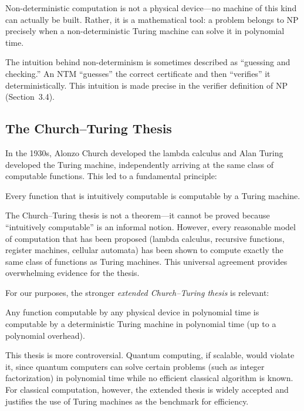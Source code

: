 Non-deterministic computation is not a physical device---no machine of this kind can actually be built. Rather, it is a mathematical tool: a problem belongs to NP precisely when a non-deterministic Turing machine can solve it in polynomial time.

\begin{remark}
The intuition behind non-determinism is sometimes described as ``guessing and checking.'' An NTM ``guesses'' the correct certificate and then ``verifies'' it deterministically. This intuition is made precise in the verifier definition of NP (Section~3.4).
\end{remark}

\subsection{The Church--Turing Thesis}

In the 1930s, Alonzo Church developed the lambda calculus and Alan Turing developed the Turing machine, independently arriving at the same class of computable functions. This led to a fundamental principle:

\begin{thesis}
Every function that is intuitively computable is computable by a Turing machine.
\end{thesis}

The Church--Turing thesis is not a theorem---it cannot be proved because ``intuitively computable'' is an informal notion. However, every reasonable model of computation that has been proposed (lambda calculus, recursive functions, register machines, cellular automata) has been shown to compute exactly the same class of functions as Turing machines. This universal agreement provides overwhelming evidence for the thesis.

For our purposes, the stronger \textit{extended Church--Turing thesis} is relevant:

\begin{thesis}
Any function computable by any physical device in polynomial time is computable by a deterministic Turing machine in polynomial time (up to a polynomial overhead).
\end{thesis}

This thesis is more controversial. Quantum computing, if scalable, would violate it, since quantum computers can solve certain problems (such as integer factorization) in polynomial time while no efficient classical algorithm is known. For classical computation, however, the extended thesis is widely accepted and justifies the use of Turing machines as the benchmark for efficiency.

